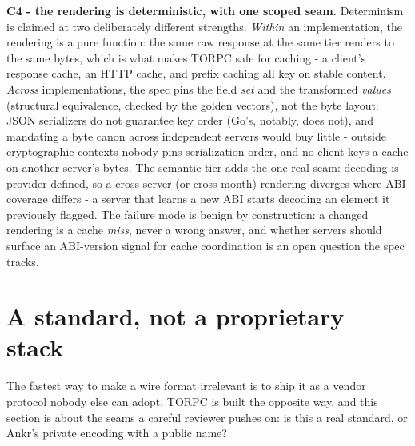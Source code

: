 \documentclass[11pt]{article}
\begin{document}
\textbf{C4 - the rendering is deterministic, with one scoped seam.} Determinism is claimed at two deliberately different strengths. \emph{Within} an implementation, the rendering is a pure function: the same raw response at the same tier renders to the same bytes, which is what makes TORPC safe for caching - a client's response cache, an HTTP cache, and prefix caching all key on stable content. \emph{Across} implementations, the spec pins the field \emph{set} and the transformed \emph{values} (structural equivalence, checked by the golden vectors), not the byte layout: JSON serializers do not guarantee key order (Go's, notably, does not), and mandating a byte canon across independent servers would buy little - outside cryptographic contexts nobody pins serialization order, and no client keys a cache on another server's bytes. The semantic tier adds the one real seam: decoding is provider-defined, so a cross-server (or cross-month) rendering diverges where ABI coverage differs - a server that learns a new ABI starts decoding an element it previously flagged. The failure mode is benign by construction: a changed rendering is a cache \emph{miss}, never a wrong answer, and whether servers should surface an ABI-version signal for cache coordination is an open question the spec tracks.

\section{A standard, not a proprietary stack}

The fastest way to make a wire format irrelevant is to ship it as a vendor protocol nobody else can adopt. TORPC is built the opposite way, and this section is about the seams a careful reviewer pushes on: is this a real standard, or Ankr's private encoding with a public name?
\end{document}
